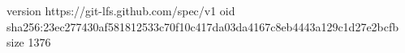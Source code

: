 version https://git-lfs.github.com/spec/v1
oid sha256:23ec277430af581812533c70f10c417da03da4167c8eb4443a129c1d27e2bcfb
size 1376
